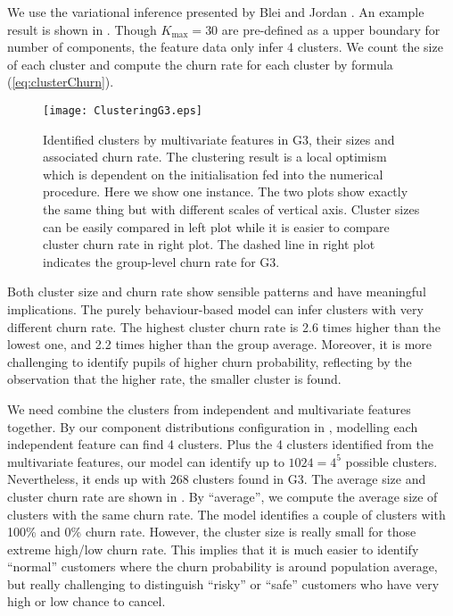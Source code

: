 We use the variational inference presented by Blei and Jordan \cite{blei2006}. An example result is shown in . Though $K_\text{max}=30$ are pre-defined as a upper boundary for number of components, the feature data only infer 4 clusters. We count the size of each cluster and compute the churn rate for each cluster by formula (\ref{eq:clusterChurn}).

\begin{figure}[!h]
\centering
\texttt{[image: ClusteringG3.eps]}
\caption{Identified clusters by multivariate features in G3, their sizes and associated churn rate. The clustering result is a local optimism which is dependent on the initialisation fed into the numerical procedure. Here we show one instance. The two plots show exactly the same thing but with different scales of vertical axis. Cluster sizes can be easily compared in left plot while it is easier to compare cluster churn rate in right plot. The dashed line in right plot indicates the group-level churn rate for G3.}
\label{fig:clusteringG3}
\end{figure}

Both cluster size and churn rate show sensible patterns and have meaningful implications. The purely behaviour-based model can infer clusters with very different churn rate. The highest cluster churn rate is 2.6 times higher than the lowest one, and 2.2 times higher than the group average. Moreover, it is more challenging to identify pupils of higher churn probability, reflecting by the observation that the higher rate, the smaller cluster is found.

We need combine the clusters from independent and multivariate features together. By our component distributions configuration in , modelling each independent feature can find 4 clusters. Plus the 4 clusters identified from the multivariate features, our model can identify up to $1024 = 4^5$ possible clusters. Nevertheless, it ends up with 268 clusters found in G3. The average size and cluster churn rate are shown in . By ``average'', we compute the average size of clusters with the same churn rate. The model identifies a couple of clusters with 100\% and 0\% churn rate. However, the cluster size is really small for those extreme high/low churn rate. This implies that it is much easier to identify ``normal'' customers where the churn probability is around population average, but really challenging to distinguish ``risky'' or ``safe'' customers who have very high or low chance to cancel.

